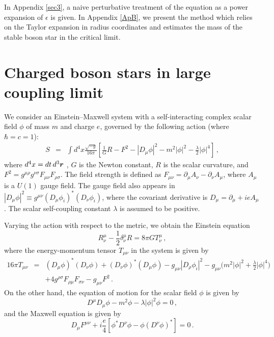 \documentclass[
aps,prd,
12pt,%
nopreprintnumbers,
showpacs,
eqsecnum,
nofootinbib
]{revtex4-1}
\begin{document}
In Appendix \ref{sec3}, a naive perturbative treatment of the equation as a power
expansion of $\epsilon$ is given. In Appendix \ref{ApB}, we present the
method which relies on the Taylor expansion in radius coordinates and estimates
the mass of the stable boson star in the critical limit.


\section{Charged boson stars in large coupling limit}
\label{sec2}
We consider an Einstein--Maxwell system with a self-interacting complex
scalar field
$\phi$ 
of  mass $m$ and charge $e$,
governed by the following action (where
$\hbar=c=1$):
\begin{eqnarray}
S&=&\int
d^4x\frac{\sqrt{-g}}{16\pi}\left[\frac{1}{G}R-F^2-
|D_\mu\phi|^2-m^2|\phi|^2-
\frac{{\lambda}}{2}|\phi|^4\right]\,,
\end{eqnarray}
where $d^4x=dt\,d^3\mbox{\boldmath $r$}$ , $G$ is the Newton constant,
$R$ is the scalar curvature, 
and $F^2=g^{\mu\rho}g^{\nu\sigma}F_{\mu\nu}F_{\rho\sigma}$.
The field strength is defined as $F_{\mu\nu}=\partial_\mu A_\nu-\partial_\nu
A_\mu$, where $A_\mu$ is a $U(1)$ gauge field. The gauge field also appears in
$|D_\mu\phi|^2\equiv
g^{\mu\nu}(D_\mu\phi_i)^*(D_\nu\phi_i)$, where
the covariant derivative is $D_{\mu}=\partial_\mu+ie A_\mu$.
The scalar self-coupling constant ${\lambda}$ is assumed to be positive.

Varying the action with respect to the metric, we obtain the Einstein equation 
\begin{equation}
R^\mu_\nu-\frac{1}{2}\delta^\mu_\nu R=8\pi G T^\mu_\nu\,,
\label{EE}
\end{equation}
where the energy-momentum tensor $T_{\mu\nu}$ in the system is given by
\begin{eqnarray}
{16\pi}T_{\mu\nu}&=&(D_\mu\phi)^*(D_\nu\phi)+
(D_\nu\phi)^*(D_\mu\phi)-
g_{\mu\nu}|D_\rho\phi_i|^2-g_{\mu\nu}\Big(
m^2|\phi|^2
+\frac{{\lambda}}{2}|\phi|^4\Big)\nonumber \\
& &+4g^{\rho\sigma}F_{\rho\mu}F_{\sigma\nu}
-g_{\mu\nu}F^2
\,.
\end{eqnarray}
On the other hand, the equation of motion for the scalar field $\phi$ is given
by
\begin{equation}
D^\mu D_\mu \phi-m^2\phi-{\lambda}|\phi|^2\phi=0\,,
\label{KE}
\end{equation}
and the Maxwell equation is given by
\begin{equation}
D_\mu F^{\mu\nu}+i\frac{e}{4}[\phi^*D^\nu\phi-\phi(D^\nu\phi)^*]=0\,.
\label{ME}
\end{equation}
\end{document}
